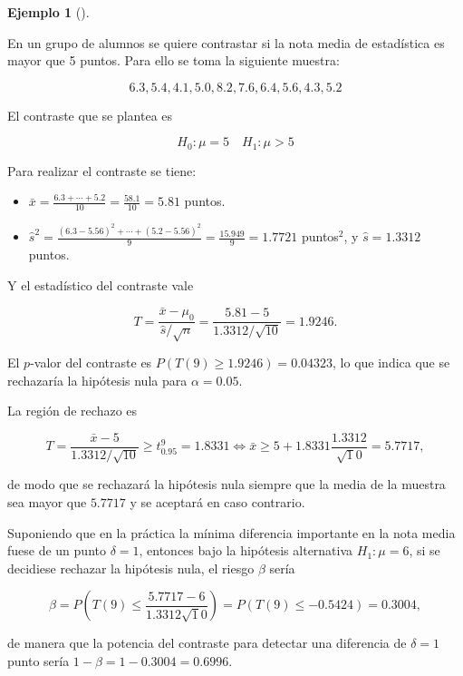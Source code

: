 \documentclass[
  a4paper,
]{scrreport}
\providecommand{\tightlist}{%
  \setlength{\itemsep}{0pt}\setlength{\parskip}{0pt}}\usepackage{longtable,booktabs,array}
\theoremstyle{plain}
\theoremstyle{definition}
\theoremstyle{definition}
\newtheorem{example}{Ejemplo}[chapter]
\theoremstyle{remark}
\begin{document}
\begin{example}[]\protect\hypertarget{exm-contraste-media-normal-varianza-desconocida}{}\label{exm-contraste-media-normal-varianza-desconocida}

En un grupo de alumnos se quiere contrastar si la nota media de
estadística es mayor que 5 puntos. Para ello se toma la siguiente
muestra:

\[
6.3, 5.4, 4.1, 5.0, 8.2, 7.6, 6.4, 5.6, 4.3, 5.2
\]

El contraste que se plantea es

\[H_0: \mu=5 \quad H_1: \mu>5\]

Para realizar el contraste se tiene:

\begin{itemize}
\tightlist
\item
  \(\bar x = \frac{6.3+\cdots+5.2}{10}=\frac{58.1}{10}=5.81\) puntos.
\item
  \(\hat s^2 = \frac{(6.3-5.56)^2+\cdots+(5.2-5.56)^2}{9} = \frac{15.949}{9}=1.7721\)
  puntos\(^2\), y \(\hat s=1.3312\) puntos.
\end{itemize}

Y el estadístico del contraste vale

\[
T=\frac{\bar x-\mu_0}{\hat s/\sqrt{n}} = \frac{5.81-5}{1.3312/\sqrt{10}}= 1.9246.
\]

El \(p\)-valor del contraste es \(P(T(9)\geq 1.9246) = 0.04323\), lo que
indica que se rechazaría la hipótesis nula para \(\alpha=0.05\).

La región de rechazo es

\[
T=\frac{\bar x-5}{1.3312/\sqrt{10}} \geq t^9_{0.95} = 1.8331 \Leftrightarrow \bar x \geq 5+1.8331\frac{1.3312}{\sqrt
10} = 5.7717,
\]

de modo que se rechazará la hipótesis nula siempre que la media de la
muestra sea mayor que \(5.7717\) y se aceptará en caso contrario.

Suponiendo que en la práctica la mínima diferencia importante en la nota
media fuese de un punto \(\delta=1\), entonces bajo la hipótesis
alternativa \(H_1:\mu=6\), si se decidiese rechazar la hipótesis nula,
el riesgo \(\beta\) sería

\[
\beta = P\left(T(9)\leq \frac{5.7717-6}{1.3312\sqrt 10}\right) = P(T(9)\leq -0.5424) = 0.3004,
\]

de manera que la potencia del contraste para detectar una diferencia de
\(\delta=1\) punto sería \(1-\beta=1-0.3004 = 0.6996\).

\end{example}
\end{document}
